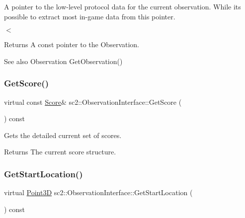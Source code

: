 A pointer to the low-\/level protocol data for the current observation. While it\textquotesingle{}s possible to extract most in-\/game data from this pointer. 

$<$ \begin{DoxyReturn}{Returns}
A const pointer to the Observation. 
\end{DoxyReturn}
\begin{DoxySeeAlso}{See also}
Observation Get\+Observation() 
\end{DoxySeeAlso}
\mbox{\label{classsc2_1_1_observation_interface_a3ced6a72078288c373ad04c72eb1fba7}} 
\subsubsection{\texorpdfstring{Get\+Score()}{GetScore()}}
{\footnotesize\ttfamily virtual const \hyperlink{structsc2_1_1_score}{Score}\& sc2\+::\+Observation\+Interface\+::\+Get\+Score (\begin{DoxyParamCaption}{ }\end{DoxyParamCaption}) const\hspace{0.3cm}{\ttfamily [pure virtual]}}

Gets the detailed current set of scores. \begin{DoxyReturn}{Returns}
The current score structure. 
\end{DoxyReturn}
\mbox{\label{classsc2_1_1_observation_interface_a67b41bf8b933702e2d83db5f7f2095f3}} 
\subsubsection{\texorpdfstring{Get\+Start\+Location()}{GetStartLocation()}}
{\footnotesize\ttfamily virtual \hyperlink{structsc2_1_1_point3_d}{Point3D} sc2\+::\+Observation\+Interface\+::\+Get\+Start\+Location (\begin{DoxyParamCaption}{ }\end{DoxyParamCaption}) const\hspace{0.3cm}{\ttfamily [pure virtual]}}

